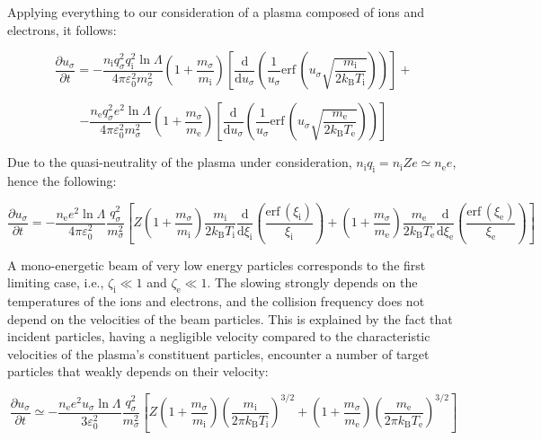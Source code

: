 Applying everything to our consideration of a plasma composed of ions and electrons, it follows:

\begin{equation*}
    \frac{\partial u_\sigma}{\partial t}=-\frac{n_\mathrm{i}q_\sigma^2q_\mathrm{i}^2\ln{\Lambda}}{4\pi\varepsilon_0^2m_\sigma^2}\left(1+\frac{m_\sigma}{m_\mathrm{i}}\right)\left[\frac{\mathrm{d}}{\mathrm{d}u_\sigma}\left(\frac{1}{u_\sigma}\mathrm{erf}\,\left(u_\sigma\sqrt{\frac{m_\mathrm{i}}{2k_\mathrm{B}T_\mathrm{i}}}\right)\right)\right]+
\end{equation*}

\begin{equation}
    \label{eq-7-51}
    -\frac{n_\text{e} q_\sigma^2e^2\ln{\Lambda}}{4\pi\varepsilon_0^2m_\sigma^2}\left(1+\frac{m_\sigma}{m_\text{e}}\right)\left[\frac{\mathrm{d}}{\mathrm{d}u_\sigma}\left(\frac{1}{u_\sigma}\mathrm{erf}\,\left(u_\sigma\sqrt{\frac{m_\text{e}}{2k_\mathrm{B}T_\text{e}}}\right)\right)\right]
\end{equation}

Due to the quasi-neutrality of the plasma under consideration, $n_\mathrm{i}q_\mathrm{i}=n_\mathrm{i}Ze\simeq n_\text{e}e$, hence the following:

\begin{equation*}
    \frac{\partial u_\sigma}{\partial t}=-\frac{n_\text{e}e^2\ln{\Lambda}}{4\pi\varepsilon_0^2}\frac{q_\sigma^2}{m_\sigma^2}\left[Z\left(1+\frac{m_\sigma}{m_\mathrm{i}}\right)\frac{m_\mathrm{i}}{2k_\mathrm{B}T_\mathrm{i}}\frac{\mathrm{d}}{\mathrm{d}\xi_\mathrm{i}}\left(\frac{\mathrm{erf}\,(\xi_\mathrm{i})}{\xi_\mathrm{i}}\right)+\left(1+\frac{m_\sigma}{m_\text{e}}\right)\frac{m_\text{e}}{2k_\mathrm{B}T_\text{e}}\frac{\mathrm{d}}{\mathrm{d}\xi_\text{e}}\left(\frac{\mathrm{erf}\,(\xi_\text{e})}{\xi_\text{e}}\right)\right]
\end{equation*}

A mono-energetic beam of very low energy particles corresponds to the first limiting case, i.e., $\zeta_\mathrm{i}\ll1$ and $\zeta_\text{e}\ll1$. The slowing strongly depends on the temperatures of the ions and electrons, and the collision frequency does not depend on the velocities of the beam particles. This is explained by the fact that incident particles, having a negligible velocity compared to the characteristic velocities of the plasma's constituent particles, encounter a number of target particles that weakly depends on their velocity:

\begin{equation*}
    \frac{\partial u_\sigma}{\partial t}\simeq-\frac{n_\text{e}e^2u_\sigma\ln{\Lambda}}{3\varepsilon_0^2}\frac{q_\sigma^2}{m_\sigma^2}\left[Z\left(1+\frac{m_\sigma}{m_\mathrm{i}}\right)\left(\frac{m_\mathrm{i}}{2\pi k_\mathrm{B}T_\mathrm{i}}\right)^{3/2}+\left(1+\frac{m_\sigma}{m_\text{e}}\right)\left(\frac{m_\text{e}}{2\pi k_\mathrm{B}T_\text{e}}\right)^{3/2}\right]
\end{equation*}


